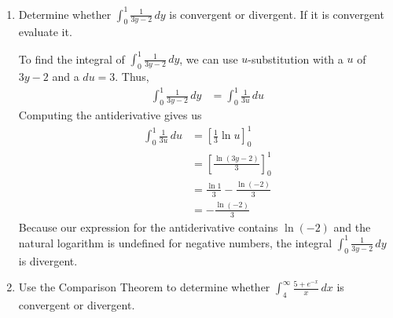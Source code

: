 \documentclass{article}
\begin{document}
\begin{enumerate}[label=\textbf{(6.\arabic*)}]


\item Determine whether $\displaystyle \int_0^1\!\frac{1}{3y-2}\,dy$ is convergent or divergent. If it is convergent evaluate it.

To find the integral of $\displaystyle \int_0^1\!\frac{1}{3y-2}\,dy$, we can use $u$-substitution with a $u$ of $3y-2$ and a $du=3$. Thus, 
\begin{align*}
    \int_0^1\!\frac{1}{3y-2}\,dy &= \int_0^1\!\frac{1}{3u}\,du
\end{align*}
Computing the antiderivative gives us
\begin{align*}
    \int_0^1\!\frac{1}{3u}\,du 
    &=\left[\frac{1}{3}\ln u\right]_0^1 \\
    &= \left[\frac{\ln(3y-2)}{3}\right]_0^1 \\
    &= \frac{\ln1}{3}-\frac{\ln(-2)}{3} \\
    &= -\frac{\ln(-2)}{3}
\end{align*}
Because our expression for the antiderivative contains $\ln(-2)$ and the natural logarithm is undefined for negative numbers, the integral $\displaystyle \int_0^1\!\frac{1}{3y-2}\,dy$ is divergent.

\newpage

\item Use the Comparison Theorem to determine whether $\displaystyle \int_4^\infty\!\frac{5+e^{-x}}{x}\,dx$ is convergent or divergent.


\end{enumerate}
\end{document}
